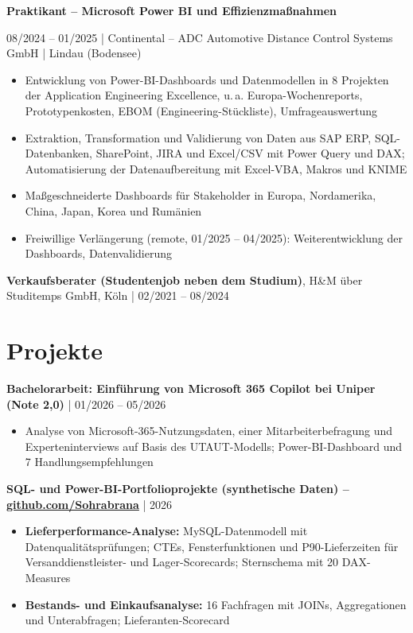 \documentclass[10pt,a4paper]{article}
\newcommand{\role}[4]{%
  \vspace{0.22em}%
  {\bfseries #1}\par
  {\color{muted}#2} | {\color{accent}#3} | {\color{muted}#4}\par}
\newcommand{\entry}[2]{%
  \vspace{0.22em}%
  {\bfseries #1} | {\color{muted}#2}\par}
\begin{document}
\role{Praktikant – Microsoft Power BI und Effizienzmaßnahmen}{08/2024 – 01/2025}
     {Continental – ADC Automotive Distance Control Systems GmbH}{Lindau (Bodensee)}
\begin{itemize}
  \item Entwicklung von Power-BI-Dashboards und Datenmodellen in 8 Projekten der Application Engineering Excellence, u.\,a. Europa-Wochenreports, Prototypenkosten, EBOM (Engineering-Stückliste), Umfrageauswertung
  \item Extraktion, Transformation und Validierung von Daten aus SAP ERP, SQL-Datenbanken, SharePoint, JIRA und Excel/CSV mit Power Query und DAX; Automatisierung der Datenaufbereitung mit Excel-VBA, Makros und KNIME
  \item Maßgeschneiderte Dashboards für Stakeholder in Europa, Nordamerika, China, Japan, Korea und Rumänien
  \item Freiwillige Verlängerung (remote, 01/2025 – 04/2025): Weiterentwicklung der Dashboards, Datenvalidierung
\end{itemize}

\vspace{0.22em}%
{\bfseries Verkaufsberater (Studentenjob neben dem Studium)}, {\color{accent}H\&M über Studitemps GmbH}, Köln | {\color{muted}02/2021 – 08/2024}\par

\section{Projekte}

\entry{Bachelorarbeit: Einführung von Microsoft 365 Copilot bei Uniper (Note 2,0)}{01/2026 – 05/2026}
\begin{itemize}
  \item Analyse von Microsoft-365-Nutzungsdaten, einer Mitarbeiterbefragung und Experteninterviews auf Basis des UTAUT-Modells; Power-BI-Dashboard und 7 Handlungsempfehlungen
\end{itemize}

\entry{SQL- und Power-BI-Portfolioprojekte (synthetische Daten) – \href{https://github.com/Sohrabrana}{github.com/Sohrabrana}}{2026}
\begin{itemize}
  \item \textbf{Lieferperformance-Analyse:} MySQL-Datenmodell mit Datenqualitätsprüfungen; CTEs, Fensterfunktionen und P90-Lieferzeiten für Versanddienstleister- und Lager-Scorecards; Sternschema mit 20 DAX-Measures
  \item \textbf{Bestands- und Einkaufsanalyse:} 16 Fachfragen mit JOINs, Aggregationen und Unterabfragen; Lieferanten-Scorecard
\end{itemize}
\end{document}

